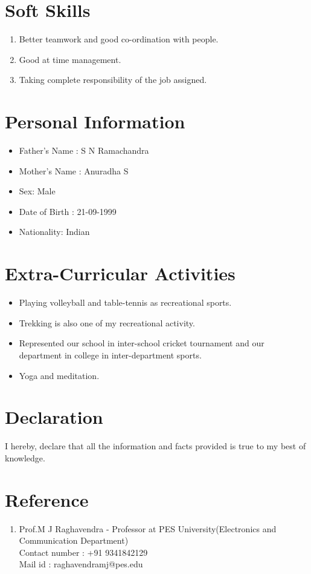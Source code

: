 \documentclass{article}
\begin{document}
	\section{Soft Skills}
	\begin{enumerate}
		\item Better teamwork and good co-ordination with people.
		\item Good at time management.
		\item Taking complete responsibility of the job assigned.
	\end{enumerate}

	\section{Personal Information}
	\begin{itemize}
		\item Father’s Name : S N Ramachandra
		\item Mother’s Name : Anuradha S
		\item Sex: Male
		\item Date of Birth : 21-09-1999
		\item Nationality: Indian
	\end{itemize}

	\section{Extra-Curricular Activities}
	\begin{itemize}
		\item Playing volleyball and table-tennis as recreational sports.
		\item Trekking is also one of my recreational activity.
		\item  Represented our school in inter-school cricket tournament and our department in college in inter-department sports.
		\item Yoga and meditation.
	\end{itemize}

	\section{Declaration}
	I hereby, declare that all the information and facts provided is true to my best of knowledge.
	
	\section{Reference}
	\begin{enumerate}
		\item Prof.M J Raghavendra - Professor at PES University(Electronics and Communication Department)
		\\Contact number : +91 9341842129
		\\Mail id : raghavendramj@pes.edu	
		
	\end{enumerate}
\end{document}
